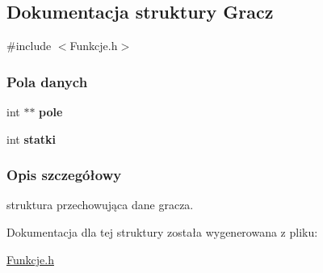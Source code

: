 \hypertarget{structGracz}{}\subsection{Dokumentacja struktury Gracz}
\label{structGracz}


{\ttfamily \#include $<$Funkcje.\+h$>$}

\subsubsection*{Pola danych}
\begin{DoxyCompactItemize}
\item 
\mbox{\label{structGracz_acdeac9175b902ddfa4b0d33aa24f591f}} 
int $\ast$$\ast$ {\bfseries pole}
\item 
\mbox{\label{structGracz_a9be08d404273a39a4f04a8df52928b60}} 
int {\bfseries statki}
\end{DoxyCompactItemize}


\subsubsection{Opis szczegółowy}
struktura przechowująca dane gracza. 

Dokumentacja dla tej struktury została wygenerowana z pliku\+:\begin{DoxyCompactItemize}
\item 
\mbox{\hyperlink{Funkcje_8h}{Funkcje.\+h}}\end{DoxyCompactItemize}
